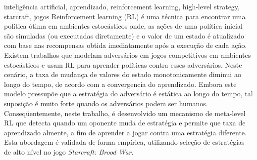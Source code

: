 \documentclass[english,twoside]{pucrs-ppgcc}
\begin{document}
\begin{resumo}{inteligência artificial, aprendizado, reinforcement learning, high-level strategy, starcraft, jogos}
Reinforcement learning (RL) é uma técnica para encontrar uma política ótima em ambientes estocásticos onde, as ações de uma política inicial são simuladas (ou executadas diretamente) e o valor de um estado é atualizado com base nas recompensas obtida imediatamente após a execução de cada ação.
Existem trabalhos que modelam adversários em jogos competitivos em ambientes estocásticos e usam RL para aprender políticas contra esses adversários.
Neste cenário, a taxa de mudança de valores do estado monotonicamente diminui ao longo do tempo, de acordo com a convergencia do aprendizado.
Embora este modelo pressupõe que a estratégia do adversário é estática ao longo do tempo, tal suposição é muito forte quando os adversários podem ser humanos.
Conseqüentemente, neste trabalho, é desenvolvido um mecanismo de meta-level RL que detecta quando um oponente muda de estratégia e permite que taxa de aprendizado almente, a fim de aprender a jogar contra uma estratégia diferente.
Esta abordagem é validada de forma empírica, utilizando seleção de estratégias de alto nível no jogo \textit{Starcraft: Brood War}.
\end{resumo}

\listoffigures
\listofalgorithms
\tableofcontents














%


\end{document}
